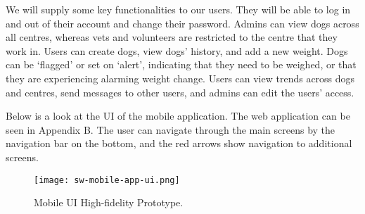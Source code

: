 We will supply some key functionalities to our users. They will be able to log in and out of their account and change their password. Admins can view dogs across all centres, whereas vets and volunteers are restricted to the centre that they work in. Users can create dogs, view dogs’ history, and add a new weight. Dogs can be ‘flagged’ or set on ‘alert’, indicating that they need to be weighed, or that they are experiencing alarming weight change. Users can view trends across dogs and centres, send messages to other users, and admins can edit the users’ access. 

Below is a look at the UI of the mobile application. The web application can be seen in Appendix B. The user can navigate through the main screens by the navigation bar on the bottom, and the red arrows show navigation to additional screens.

\begin{figure}[!ht]
	\centering
	\texttt{[image: sw-mobile-app-ui.png]}
	\caption{Mobile UI High-fidelity Prototype.}
	\label{fig:mobileapp-1}
\end{figure}

 

